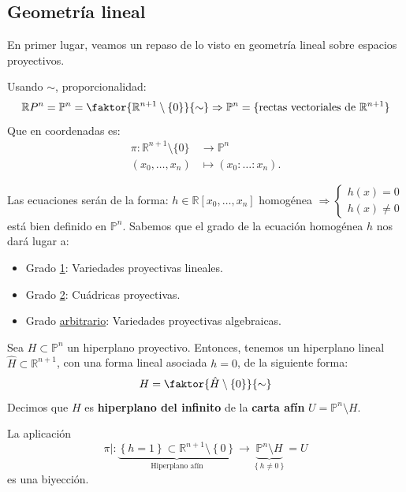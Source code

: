 \subsection{Geometría lineal}
\label{sub:geometría_lineal}
En primer lugar, veamos un repaso de lo visto en geometría lineal sobre espacios proyectivos.
\begin{defi}    
Usando $\sim$, proporcionalidad: 
\[
\mathbb{R}P^n = \mathbb{P}^{n} = \faktor{\mathbb{R}^{n+1}\setminus \{0\}}{\sim} \Rightarrow \mathbb{P}^{n} = \{\text{rectas vectoriales de } \mathbb{R}^{n+1}\}     
\]
Que en coordenadas es:
\begin{align*}
    \pi: \mathbb{R}^{n+1} \setminus \{0\} &\rightarrow \mathbb{P}^{n}\\
    \left( x_0, \ldots, x_n \right) &\mapsto \left( x_0 : \ldots : x_n \right) 
.\end{align*}
\end{defi}
\begin{obs}
Las ecuaciones serán de la forma: $h\in \mathbb{R}\left[ x_0, \ldots, x_n \right]$ homogénea $\Rightarrow \begin{cases}
    h\left( x \right) = 0\\
    h\left( x \right) \neq 0
\end{cases}$ está bien definido en $\mathbb{P}^{n}$.
Sabemos que el grado de la ecuación homogénea $h$ nos dará lugar a:
\begin{itemize}
    \item Grado \underline{1}: Variedades proyectivas lineales.
    \item Grado \underline{2}: Cuádricas proyectivas.
    \item Grado \underline{arbitrario}: Variedades proyectivas algebraicas.
\end{itemize}
\end{obs}

\begin{defi}
Sea $H \subset \mathbb{P}^n$ un hiperplano proyectivo. Entonces, tenemos un hiperplano lineal $\hat{H} \subset \mathbb{R}^{n+1}$, con una forma lineal asociada $h = 0$, de la siguiente forma:
\[
H = \faktor{\hat{H}\setminus \left\{ 0 \right\}}{\sim}
\]
Decimos que $H$ es \textbf{hiperplano del infinito} de la \textbf{carta afín} $U = \mathbb{P}^n \setminus H$.
\end{defi}
\begin{prop}
La aplicación 
\[
\pi|: \underbrace{\left\{ h = 1 \right\}\subset \mathbb{R}^{n+1} \setminus \left\{ 0 \right\}}_{\text{Hiperplano afín}} \rightarrow \underbrace{\mathbb{P}^{n} \setminus H}_{\left\{ h \neq 0 \right\}} = U
\]
es una biyección.
\end{prop}

